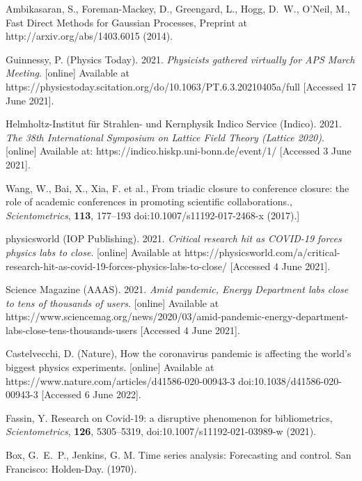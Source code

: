 \documentclass[]{rsos}%
\begin{document}
\begin{thebibliography}{10}
{Ambikasaran, S., Foreman-Mackey, D., Greengard, L., Hogg, D.~W., O'Neil, M.,}
{Fast Direct Methods for Gaussian Processes}, Preprint at http://arxiv.org/abs/1403.6015 \newblock (2014).

Guinnessy, P. (Physics Today). 2021. \emph{Physicists gathered virtually for APS March Meeting}. [online] Available at {https://physicstoday.scitation.org/do/10.1063/PT.6.3.20210405a/full} [Accessed 17 June 2021].
 
Helmholtz-Institut f\"ur Strahlen- und Kernphysik Indico Service (Indico). 2021. \emph{The 38th International Symposium on Lattice Field Theory (Lattice 2020)}. [online] Available at: {https://indico.hiskp.uni-bonn.de/event/1/} [Accessed 3 June 2021].

{Wang, W., Bai, X., Xia, F. et al.}, {From triadic closure to conference closure: the role of academic conferences in promoting scientific collaborations.}, \emph{Scientometrics}, \textbf{113}, 177–193  doi:10.1007/s11192-017-2468-x \newblock (2017).]

physicsworld (IOP Publishing). 2021. \emph{Critical research hit as COVID-19 forces physics labs to close}. [online] Available at {https://physicsworld.com/a/critical-research-hit-as-covid-19-forces-physics-labs-to-close/} [Accessed 4 June 2021].


Science Magazine (AAAS). 2021. \emph{Amid pandemic, Energy Department labs close to tens of thousands of users.} [online] Available at {https://www.sciencemag.org/news/2020/03/amid-pandemic-energy-department-labs-close-tens-thousands-users} [Accessed 4 June 2021].

Castelvecchi, D. (Nature), {How the coronavirus pandemic is affecting the world's biggest physics experiments.} [online] Available at {https://www.nature.com/articles/d41586-020-00943-3} doi:10.1038/d41586-020-00943-3 [Accessed 6 June 2022].

{Fassin, Y.} {Research on Covid-19: a disruptive phenomenon for bibliometrics}, \emph{Scientometrics}, \textbf{126}, 5305--5319, doi:10.1007/s11192-021-03989-w \newblock (2021).

{Box, G.~E.~P., Jenkins, G. M.} Time series analysis: Forecasting and control. San Francisco: Holden-Day. \newblock (1970).

\end{thebibliography}
\end{document}
